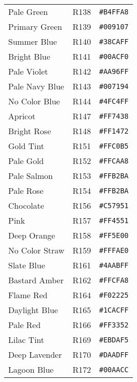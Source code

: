 \documentclass[a4paper]{article}
\begin{document}
\begin{longtable}{|l|l|r|}
Pale Green & R138 & \texttt{\#B4FFA8} \cellcolor[HTML]{B4FFA8} \\
Primary Green & R139 & \texttt{\#009107} \cellcolor[HTML]{009107} \\
Summer Blue & R140 & \texttt{\#38CAFF} \cellcolor[HTML]{38CAFF} \\
Bright Blue & R141 & \texttt{\#00ACF0} \cellcolor[HTML]{00ACF0} \\
Pale Violet & R142 & \texttt{\#AA96FF} \cellcolor[HTML]{AA96FF} \\
Pale Navy Blue & R143 & \texttt{\#007194} \cellcolor[HTML]{007194} \\
No Color Blue & R144 & \texttt{\#4FC4FF} \cellcolor[HTML]{4FC4FF} \\
Apricot & R147 & \texttt{\#FF7438} \cellcolor[HTML]{FF7438} \\
Bright Rose & R148 & \texttt{\#FF1472} \cellcolor[HTML]{FF1472} \\
Gold Tint & R151 & \texttt{\#FFC0B5} \cellcolor[HTML]{FFC0B5} \\
Pale Gold & R152 & \texttt{\#FFCAA8} \cellcolor[HTML]{FFCAA8} \\
Pale Salmon & R153 & \texttt{\#FFB2BA} \cellcolor[HTML]{FFB2BA} \\
Pale Rose & R154 & \texttt{\#FFB2BA} \cellcolor[HTML]{FFB2BA} \\
Chocolate & R156 & \texttt{\#C57951} \cellcolor[HTML]{C57951} \\
Pink & R157 & \texttt{\#FF4551} \cellcolor[HTML]{FF4551} \\
Deep Orange & R158 & \texttt{\#FF5E00} \cellcolor[HTML]{FF5E00} \\
No Color Straw & R159 & \texttt{\#FFFAE0} \cellcolor[HTML]{FFFAE0} \\
Slate Blue & R161 & \texttt{\#4AABFF} \cellcolor[HTML]{4AABFF} \\
Bastard Amber & R162 & \texttt{\#FFCFA8} \cellcolor[HTML]{FFCFA8} \\
Flame Red & R164 & \texttt{\#F02225} \cellcolor[HTML]{F02225} \\
Daylight Blue & R165 & \texttt{\#1CACFF} \cellcolor[HTML]{1CACFF} \\
Pale Red & R166 & \texttt{\#FF3352} \cellcolor[HTML]{FF3352} \\
Lilac Tint & R169 & \texttt{\#EBDAF5} \cellcolor[HTML]{EBDAF5} \\
Deep Lavender & R170 & \texttt{\#DAADFF} \cellcolor[HTML]{DAADFF} \\
Lagoon Blue & R172 & \texttt{\#00AACC} \cellcolor[HTML]{00AACC} \\

\end{longtable}
\end{document}
